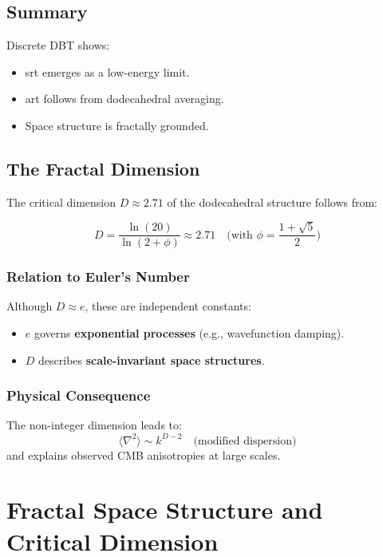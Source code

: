 \subsection{Summary}  
Discrete DBT shows:  
\begin{itemize}  
\item \gls{srt} emerges as a low-energy limit.  
\item \gls{art} follows from dodecahedral averaging.  
\item Space structure is fractally grounded.  
\end{itemize}  

\subsection{The Fractal Dimension}  
\label{subsec:fractal_dimension}  

The critical dimension $D \approx 2.71$ of the dodecahedral structure follows from:  

\begin{equation}  
D = \frac{\ln(20)}{\ln(2 + \phi)} \approx 2.71 \quad \text{(with } \phi = \frac{1 + \sqrt{5}}{2}\text{)}  
\end{equation}  

\subsubsection*{Relation to Euler's Number}  
Although $D \approx e$, these are independent constants:  
\begin{itemize}  
\item $e$ governs \textbf{exponential processes} (e.g., wavefunction damping).  
\item $D$ describes \textbf{scale-invariant space structures}.  
\end{itemize}  

\subsubsection*{Physical Consequence}  
The non-integer dimension leads to:  
\begin{equation}  
\langle \nabla^2 \rangle \sim k^{D-2} \quad \text{(modified dispersion)}  
\end{equation}  
and explains observed CMB anisotropies at large scales.  

\section{Fractal Space Structure and Critical Dimension}  
\label{sec:fractal_structure}  

